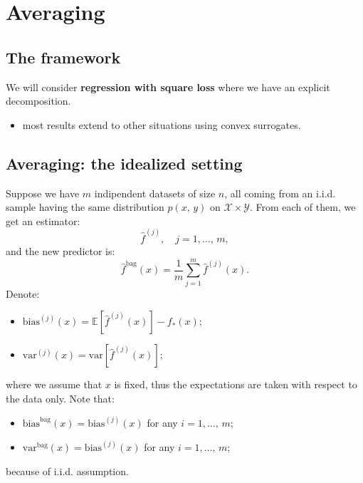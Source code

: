 \documentclass[
11pt,notheorems,hyperref={pdfauthor=whatever}
]{beamer}
\begin{document}
\justifying
\section{Averaging}
\subsection{The framework}
\begin{frame}
    We will consider \alert{\textbf{regression with square loss}} where we have an explicit  decomposition.
    \begin{itemize}
        \item most results extend to other situations using convex surrogates.
    \end{itemize}
\end{frame}

\subsection{Averaging: the idealized setting}
\begin{frame}
    Suppose we have \(m\) indipendent datasets of size \(n\), all coming from an i.i.d. sample having the same distribution \(p(x,\,y)\) on \(\mathcal{X}\times\mathcal{Y}\). From each of them, we get an estimator:
    \[
        \hat{f}^{(j)},\quad j=1,\dots,\,m,
    \]
    and the new predictor is:
    \[
        \hat{f}^{\text{bag}}(x) = \frac{1}{m} \sum_{j=1}^m \hat{f}^{(j)}(x).
    \]
    Denote:
    \begin{itemize}
        \item \(\text{bias}^{(j)}(x)=\mathbb{E}\left[\hat{f}^{(j)}(x)\right]-f_*(x)\);
        \item \(\text{var}^{(j)}(x)=\text{var}\left[\hat{f}^{(j)}(x)\right]\);
    \end{itemize}
    where we assume that \(x\) is fixed, thus the expectations are taken with respect to the data only. Note that:
    \begin{itemize}
        \item \(\text{bias}^{\text{bag}}(x)=\text{bias}^{(j)}(x)\) for any \(i=1,\dots,\,m\);
        \item \(\text{var}^{\text{bag}}(x)=\text{bias}^{(j)}(x)\) for any \(i=1,\dots,\,m\);
    \end{itemize}
    because of i.i.d. assumption. 
\end{frame}
\end{document}
